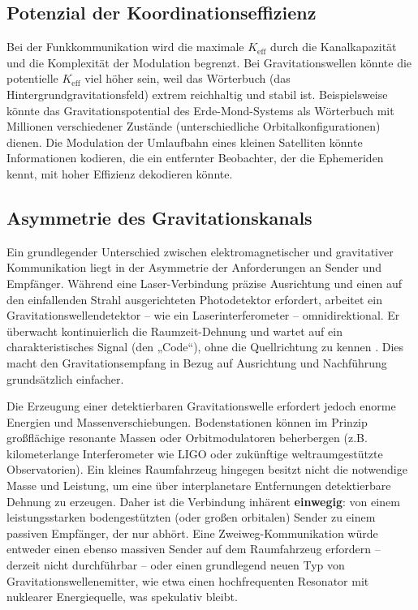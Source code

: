\documentclass[12pt,a4paper]{article}
\newcommand{\Keff}{K_{\mathrm{eff}}}
\begin{document}
	\subsection{Potenzial der Koordinationseffizienz}
	
	Bei der Funkkommunikation wird die maximale \(\Keff\) durch die Kanalkapazität und die Komplexität der Modulation begrenzt. Bei Gravitationswellen könnte die potentielle \(\Keff\) viel höher sein, weil das Wörterbuch (das Hintergrundgravitationsfeld) extrem reichhaltig und stabil ist. Beispielsweise könnte das Gravitationspotential des Erde-Mond-Systems als Wörterbuch mit Millionen verschiedener Zustände (unterschiedliche Orbitalkonfigurationen) dienen. Die Modulation der Umlaufbahn eines kleinen Satelliten könnte Informationen kodieren, die ein entfernter Beobachter, der die Ephemeriden kennt, mit hoher Effizienz dekodieren könnte.
	
	\subsection{Asymmetrie des Gravitationskanals}
	\label{subsec:asymmetry}
	
	Ein grundlegender Unterschied zwischen elektromagnetischer und gravitativer Kommunikation liegt in der Asymmetrie der Anforderungen an Sender und Empfänger. Während eine Laser-Verbindung präzise Ausrichtung und einen auf den einfallenden Strahl ausgerichteten Photodetektor erfordert, arbeitet ein Gravitationswellendetektor – wie ein Laserinterferometer – omnidirektional. Er überwacht kontinuierlich die Raumzeit-Dehnung und wartet auf ein charakteristisches Signal (den „Code“), ohne die Quellrichtung zu kennen \cite{LIGO}. Dies macht den Gravitationsempfang in Bezug auf Ausrichtung und Nachführung grundsätzlich einfacher.
	
	Die Erzeugung einer detektierbaren Gravitationswelle erfordert jedoch enorme Energien und Massenverschiebungen. Bodenstationen können im Prinzip großflächige resonante Massen oder Orbitmodulatoren beherbergen (z.B. kilometerlange Interferometer wie LIGO oder zukünftige weltraumgestützte Observatorien). Ein kleines Raumfahrzeug hingegen besitzt nicht die notwendige Masse und Leistung, um eine über interplanetare Entfernungen detektierbare Dehnung zu erzeugen. Daher ist die Verbindung inhärent \textbf{einwegig}: von einem leistungsstarken bodengestützten (oder großen orbitalen) Sender zu einem passiven Empfänger, der nur abhört. Eine Zweiweg-Kommunikation würde entweder einen ebenso massiven Sender auf dem Raumfahrzeug erfordern – derzeit nicht durchführbar – oder einen grundlegend neuen Typ von Gravitationswellenemitter, wie etwa einen hochfrequenten Resonator mit nuklearer Energiequelle, was spekulativ bleibt.
	
\end{document}
